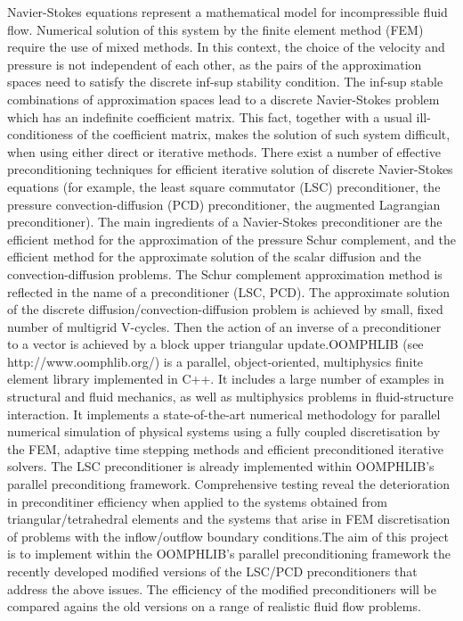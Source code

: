 Navier-Stokes equations represent a mathematical model for incompressible fluid flow. Numerical solution of this system by the finite element method (FEM) require the use of mixed methods. In this context, the choice of the velocity and pressure is not independent of each other, as the pairs of the approximation spaces need to satisfy the discrete inf-sup stability condition. The inf-sup stable combinations of approximation spaces lead to a discrete Navier-Stokes problem which has an indefinite coefficient matrix. This fact, together with a usual ill-conditioness of the coefficient matrix, makes the solution of such system difficult, when using either direct or iterative methods. There exist a number of effective preconditioning techniques for efficient iterative solution of discrete Navier-Stokes equations (for example, the least square commutator (LSC) preconditioner, the pressure convection-diffusion (PCD) preconditioner, the augmented Lagrangian preconditioner). The main ingredients of a Navier-Stokes preconditioner are the efficient method for the approximation of the pressure Schur complement, and the efficient method for the approximate solution of the scalar diffusion and the convection-diffusion problems. The Schur complement approximation method is reflected in the name of a preconditioner (LSC, PCD). The approximate solution of the discrete diffusion/convection-diffusion problem is achieved by small, fixed number of multigrid V-cycles. Then the action of an inverse of a preconditioner to a vector is achieved by a block upper triangular update.OOMPHLIB (see http://www.oomphlib.org/) is a parallel, object-oriented, multiphysics finite element library implemented in C++. It includes a large number of examples in structural and fluid mechanics, as well as multiphysics problems in fluid-structure interaction. It implements a state-of-the-art numerical methodology for parallel numerical simulation of physical systems using a fully coupled discretisation by the FEM, adaptive time stepping methods and efficient preconditioned iterative solvers. The LSC preconditioner is already implemented within OOMPHLIB's parallel preconditiong framework. Comprehensive testing reveal the deterioration in preconditiner efficiency when applied to the systems obtained from triangular/tetrahedral elements and the systems that arise in FEM discretisation of problems with the inflow/outflow boundary conditions.The aim of this project is to implement within the OOMPHLIB's parallel preconditioning framework the recently developed modified versions of the LSC/PCD preconditioners that address the above issues. The efficiency of the modified preconditioners will be compared agains the old versions on a range of realistic fluid flow problems.~\cite{duffy}
